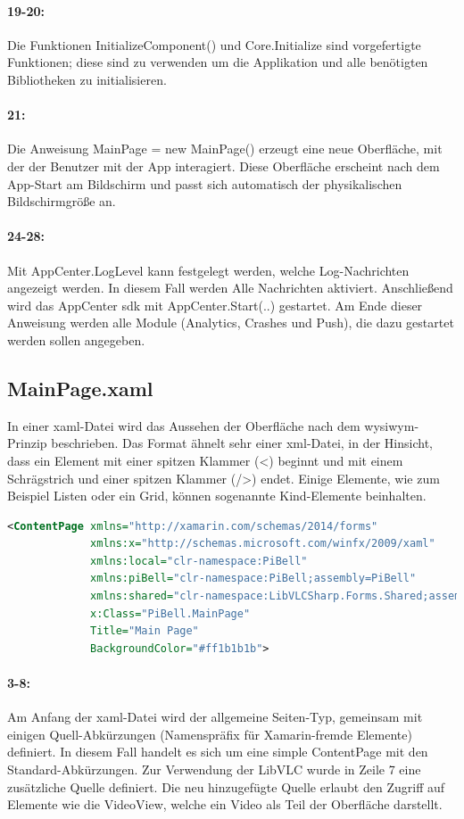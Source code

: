 \paragraph{19-20:} Die Funktionen InitializeComponent() und Core.Initialize sind vorgefertigte Funktionen; diese sind zu verwenden um die Applikation und alle benötigten Bibliotheken zu initialisieren.
\paragraph{21:} Die Anweisung MainPage = new MainPage() erzeugt eine neue Oberfläche, mit der der Benutzer mit der App interagiert. Diese Oberfläche erscheint nach dem App-Start am Bildschirm und passt sich automatisch der physikalischen Bildschirmgröße an.
\paragraph{24-28:} Mit AppCenter.LogLevel kann festgelegt werden, welche Log-Nachrichten angezeigt werden. In diesem Fall werden Alle Nachrichten aktiviert.
Anschließend wird das AppCenter \acs{sdk} mit AppCenter.Start(..) gestartet. Am Ende dieser Anweisung werden alle Module (Analytics, Crashes und Push), die dazu gestartet werden sollen angegeben.

\subsection{MainPage.xaml}
In einer \acs{xaml}-Datei wird das Aussehen der Oberfläche nach dem \acs{wysiwym}-Prinzip beschrieben. Das Format ähnelt sehr einer \acs{xml}-Datei, in der Hinsicht, dass ein Element mit einer spitzen Klammer (<) beginnt und mit einem Schrägstrich und einer spitzen Klammer (/>) endet. Einige Elemente, wie zum Beispiel Listen oder ein Grid, können sogenannte Kind-Elemente beinhalten.
\begin{lstlisting}[firstnumber=3,language=xml]
<ContentPage xmlns="http://xamarin.com/schemas/2014/forms"
             xmlns:x="http://schemas.microsoft.com/winfx/2009/xaml"
             xmlns:local="clr-namespace:PiBell"
             xmlns:piBell="clr-namespace:PiBell;assembly=PiBell"
             xmlns:shared="clr-namespace:LibVLCSharp.Forms.Shared;assembly=LibVLCSharp.Forms"
             x:Class="PiBell.MainPage"
             Title="Main Page"
             BackgroundColor="#ff1b1b1b">
\end{lstlisting}
\paragraph{3-8:} Am Anfang der \acs{xaml}-Datei wird der allgemeine Seiten-Typ, gemeinsam mit einigen Quell-Abkürzungen (Namenspräfix für Xamarin-fremde Elemente) definiert. In diesem Fall handelt es sich um eine simple ContentPage mit den Standard-Abkürzungen. Zur Verwendung der LibVLC wurde in Zeile 7 eine zusätzliche Quelle definiert. Die neu hinzugefügte Quelle erlaubt den Zugriff auf Elemente wie die VideoView, welche ein Video als Teil der Oberfläche darstellt.
